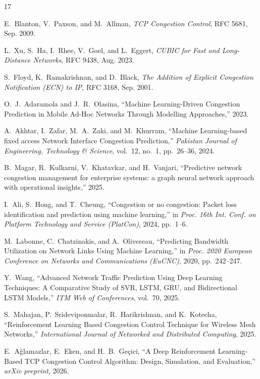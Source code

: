 \documentclass[journal]{IEEEtran}
\begin{document}
\begin{thebibliography}{17}


E.~Blanton, V.~Paxson, and M.~Allman, \textit{TCP Congestion Control}, RFC 5681, Sep. 2009.

L.~Xu, S.~Ha, I.~Rhee, V.~Goel, and L.~Eggert, \textit{CUBIC for Fast and Long-Distance Networks}, RFC 9438, Aug. 2023.

S.~Floyd, K.~Ramakrishnan, and D.~Black, \textit{The Addition of Explicit Congestion Notification (ECN) to IP}, RFC 3168, Sep. 2001.

O.~J.~Adaramola and J.~R.~Olasina, ``Machine Learning-Driven Congestion Prediction in Mobile Ad-Hoc Networks Through Modelling Approaches,'' 2023.

A.~Akhtar, I.~Zafar, M.~A.~Zaki, and M.~Khurram, ``Machine Learning-based fixed access Network Interface Congestion Prediction,'' \textit{Pakistan Journal of Engineering, Technology \& Science}, vol.~12, no.~1, pp.~26--36, 2024.

B.~Magar, R.~Kulkarni, V.~Khatavkar, and H.~Vanjari, ``Predictive network congestion management for enterprise systems: a graph neural network approach with operational insights,'' 2025.

I.~Ali, S.~Hong, and T.~Cheung, ``Congestion or no congestion: Packet loss identification and prediction using machine learning,'' in \textit{Proc. 16th Int. Conf. on Platform Technology and Service (PlatCon)}, 2024, pp.~1--6.

M.~Labonne, C.~Chatzinakis, and A.~Olivereau, ``Predicting Bandwidth Utilization on Network Links Using Machine Learning,'' in \textit{Proc. 2020 European Conference on Networks and Communications (EuCNC)}, 2020, pp.~242--247.

Y.~Wang, ``Advanced Network Traffic Prediction Using Deep Learning Techniques: A Comparative Study of SVR, LSTM, GRU, and Bidirectional LSTM Models,'' \textit{ITM Web of Conferences}, vol.~70, 2025.

S.~Mahajan, P.~Srideviponmalar, R.~Harikrishnan, and K.~Kotecha, ``Reinforcement Learning Based Congestion Control Technique for Wireless Mesh Networks,'' \textit{International Journal of Networked and Distributed Computing}, 2025.

E.~A\v{g}lamazlar, E.~Eken, and H.~B.~Ge\c{c}ici, ``A Deep Reinforcement Learning-Based TCP Congestion Control Algorithm: Design, Simulation, and Evaluation,'' \textit{arXiv preprint}, 2026.


\end{thebibliography}
\end{document}
